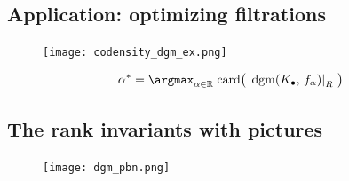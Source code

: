 \documentclass[
  letterpaper,
  DIV=11,
  numbers=noendperiod,
  oneside]{scrartcl}
\begin{document}
\begin{figure}

\begin{minipage}[t]{0.50\linewidth}

{\centering 


}

\end{minipage}%
%
\begin{minipage}[t]{0.50\linewidth}

{\centering 


}

\end{minipage}%

\end{figure}

\hypertarget{application-optimizing-filtrations}{%
\subsection{Application: optimizing
filtrations}\label{application-optimizing-filtrations}}

\begin{figure}

{\centering \texttt{[image: codensity\_dgm\_ex.png]}

}

\end{figure}

\[ \alpha^\ast = \argmax_{\alpha \in \mathbb{R}} \; \mathrm{card}\big(\, \left.\mathrm{dgm}(K_\bullet, \, f_\alpha) \right|_{R} \, \big) \]

\hypertarget{the-rank-invariants-with-pictures}{%
\subsection{The rank invariants with
pictures}\label{the-rank-invariants-with-pictures}}

\begin{figure}

{\centering \texttt{[image: dgm\_pbn.png]}

}

\end{figure}
\end{document}
